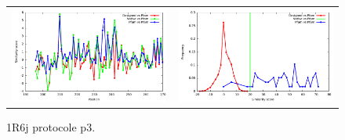 \documentclass[a4paper,12pt]{article}
\begin{document}
   \begin{figure}[t]
     \centering
     \begin{tabular}{cc}
       \includegraphics[width=8.45cm]{gen_08032012/1R6J/p3/similarity_bypos.pdf} &
       \includegraphics[width=8.45cm]{gen_08032012/1R6J/p3/similarity_byseq_frequency.pdf} \\
     \end{tabular}
     
     \caption{1R6j protocole p3.}
     \label{1R6J}
   \end{figure}
\end{document}
